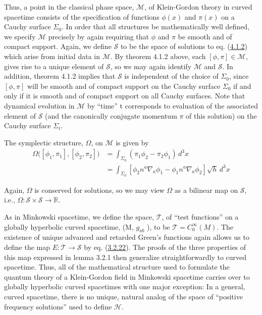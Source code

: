 \documentclass[11pt,a4paper]{article}
\begin{document}
Thus, a point in the classical phase space, \(\mathcal{M}\), of Klein-Gordon theory in curved spacetime consists of the specification of functions \(\phi(x)\) and \(\pi(x)\) on a Cauchy surface \(\Sigma_0\). In order that all structures be mathematically well defined, we specify \(\mathcal{M}\) precisely by again requiring that \(\phi\) and \(\pi\) be smooth and of compact support. Again, we define \(\mathcal{S}\) to be the space of solutions to eq. (\hyperref[eq:4.1.2]{4.1.2}) which arise from initial \hypertarget{source-71}{} data in \(\mathcal{M}\). By theorem 4.1.2 above, each \([\phi,\pi] \in \mathcal{M}\), gives rise to a unique element of \(\mathcal{S}\), so we may again identify \(\mathcal{M}\) and \(\mathcal{S}\). In addition, theorem 4.1.2 implies that \(\mathcal{S}\) is independent of the choice of \(\Sigma_0\), since \([\phi,\pi]\) will be smooth and of compact support on the Cauchy surface \(\Sigma_0\) if and only if it is smooth and of compact support on all Cauchy surfaces. Note that dynamical evolution in \(\mathcal{M}\) by ``time'' t corresponds to evaluation of the associated element of \(\mathcal{S}\) (and the canonically conjugate momentum \(\pi\) of this solution) on the Cauchy surface \(\Sigma_t\).

The symplectic structure, \(\Omega\), on \(\mathcal{M}\) is given by
\begin{equation*}
\begin{aligned} \Omega\big([\phi_1, \pi_1], [\phi_2, \pi_2]\big) &= \int_{\Sigma_0} (\pi_1\phi_2 - \pi_2\phi_1) \,d^3x \\ &= \int_{\Sigma_0} [\phi_2 n^a\nabla_a \phi_1 - \phi_1 n^a\nabla_a \phi_2] \sqrt{h} \,d^3x \end{aligned}\tag{4.2.6}\label{eq:4.2.6}
\end{equation*}

Again, \(\Omega\) is conserved for solutions, so we may view \(\Omega\) as a bilinear map on \(\mathcal{S}\), i.e., \(\Omega: \mathcal{S} \times \mathcal{S} \to \mathbb{R}\).

As in Minkowski spacetime, we define the space, \(\mathcal{T}\), of ``test functions'' on a globally hyperbolic curved spacetime, (M, \(g_{ab}\) ), to be \(\mathcal{T} = C_0^\infty(M)\). The existence of unique advanced and retarded Green's functions again allows us to define the map \(E:\mathcal{T} \to \mathcal{S}\) by eq. (\hyperref[eq:3.2.22]{3.2.22}). The proofs of the three properties of this map expressed in lemma 3.2.1 then generalize straightforwardly to curved spacetime. Thus, all of the mathematical structure used to formulate the quantum theory of a Klein-Gordon field in Minkowski spacetime carries over to globally hyperbolic curved spacetimes with one major exception: In a general, curved spacetime, there is no unique, natural analog of the space of ``positive frequency solutions'' used to define \(\mathcal{H}\).
\end{document}
